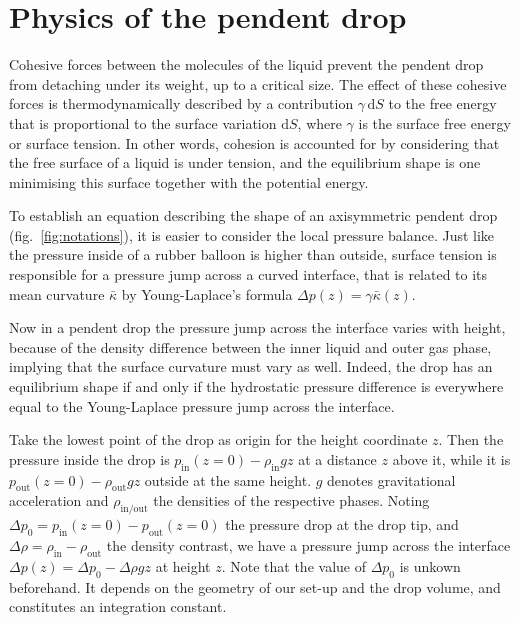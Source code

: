 \documentclass[fleqn]{scrartcl}
\newcommand{\ud}{\mathrm{d}}%
\begin{document}
\section{Physics of the pendent drop}
\label{sec:theory}

Cohesive forces between the molecules of the liquid prevent the
pendent drop from detaching under its weight, up to a critical size.
The effect of these cohesive forces is thermodynamically described by
a contribution $\gamma\, \ud S$ to the free energy that is
proportional to the surface variation $\ud S$, where $\gamma$ is the
surface free energy or surface tension. In other words, cohesion is
accounted for by considering that the free surface of a liquid is
under tension, and the equilibrium shape is one minimising this
surface together with the potential energy.

To establish an equation describing the shape of an axisymmetric
pendent drop (fig.~\ref{fig:notations}), it is easier to consider the
local pressure balance. Just like the pressure inside of a rubber
balloon is higher than outside, surface tension is responsible for a
pressure jump across a curved interface, that is related to its mean
curvature $\bar\kappa$ by Young-Laplace's formula $\Delta\! p(z) =
\gamma \bar\kappa(z)$.

Now in a pendent drop the pressure jump across the interface varies
with height, because of the density difference between the inner
liquid and outer gas phase, implying that the surface curvature must
vary as well. Indeed, the drop has an equilibrium shape if and only if
the hydrostatic pressure difference is everywhere equal to the
Young-Laplace pressure jump across the interface.

Take the lowest point of the drop as origin for the height coordinate
$z$. Then the pressure inside the drop is $p_{\mathrm{in}}(z=0) -
\rho_{\mathrm{in}} g z$ at a distance $z$ above it, while it is
$p_{\mathrm{out}}(z=0) - \rho_{\mathrm{out}} g z$ outside at the same
height. $g$ denotes gravitational acceleration and
$\rho_{\mathrm{in/out}}$ the densities of the respective phases.
Noting $\Delta\! p_0 = p_{\mathrm{in}}(z=0) - p_{\mathrm{out}}(z=0)$
the pressure drop at the drop tip, and $\Delta\!\rho =
\rho_{\mathrm{in}} - \rho_{\mathrm{out}}$ the density contrast, we
have a pressure jump across the interface $\Delta\! p(z) = \Delta\!
p_0 - \Delta\!\rho g z$ at height $z$. Note that the value of
$\Delta\! p_0$ is unkown beforehand. It depends on the geometry of our
set-up and the drop volume, and constitutes an integration constant.
\end{document}
